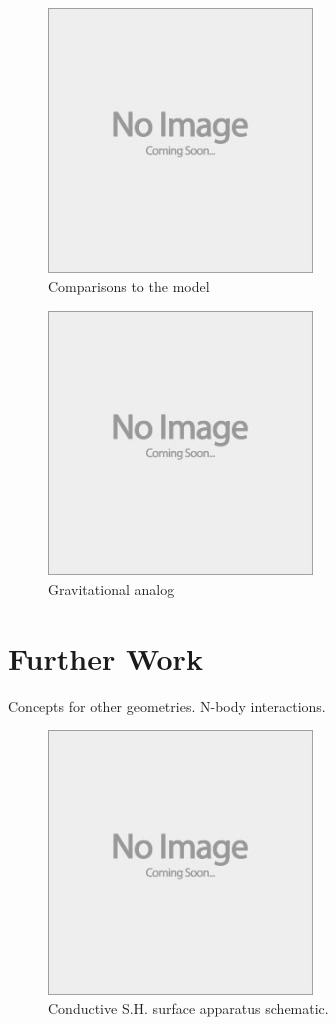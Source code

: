 \documentclass{jfm}
\begin{document}
\begin{figure}
  \centerline{\includegraphics[height=7cm,width=7cm]{e88_1_thumb.jpg}}
  \caption{Comparisons to the model}
\label{fig:model_comp}
\end{figure}

\begin{figure}
  \centerline{\includegraphics[height=7cm,width=7cm]{e88_1_thumb.jpg}}
  \caption{Gravitational analog}
\label{fig:stability}
\end{figure}

\section{Further Work}
Concepts for other geometries. N-body interactions.

\begin{figure}
  \centerline{\includegraphics[height=7cm,width=7cm]{e88_1_thumb.jpg}}
  \caption{Conductive S.H. surface apparatus schematic.}
\label{fig:conductive_SH_apparatus}
\end{figure}
\end{document}
